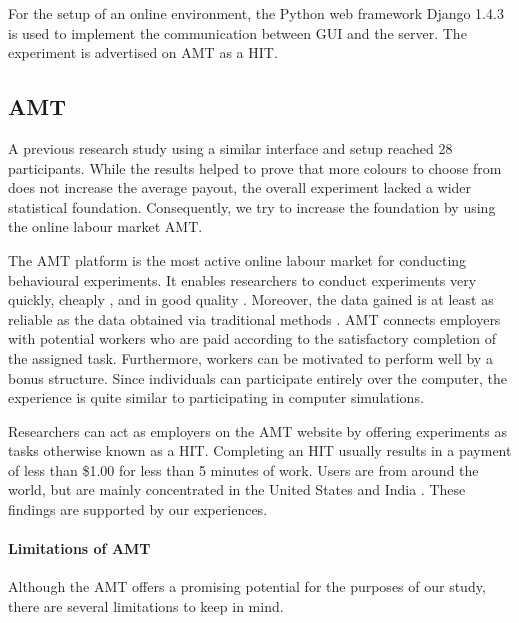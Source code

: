 For the setup of an online environment, the Python web framework Django 1.4.3 is used to implement the communication between \ac{GUI} and the server.
The experiment is advertised on \acf{AMT} as a \ac{HIT}.

\subsection{\acl{AMT}}
\label{ch:Experiment:sec:OnlineImplementation:subsec:AMT}
A previous research study \citep{Schmidt2012} using a similar interface and setup reached 28 participants. While the results helped to prove that more colours to choose from does not increase the average payout, the overall experiment lacked a wider statistical foundation.
Consequently, we try to increase the foundation by using the online labour market \acf{AMT}.

The \ac{AMT} platform is the most active online labour market for conducting behavioural experiments. It enables researchers to conduct experiments very quickly, cheaply \citep{Rand2012}, and in good quality \citep{Gardner2012}. Moreover, the data gained is at least as reliable as the data obtained via traditional methods \citep{Buhrmester2011}. \ac{AMT} connects employers with potential workers who are paid according to the satisfactory completion of the assigned task. Furthermore, workers can be motivated to perform well by a bonus structure. Since individuals can participate entirely over the computer, the experience is quite similar to participating in computer simulations.

Researchers can act as employers on the \ac{AMT} website by offering experiments as tasks otherwise known as a \acf{HIT}. Completing an \ac{HIT} usually results in a payment of less than \$1.00 for less than 5 minutes of work. Users are from around the world, but are mainly concentrated in the United States and India \citep{Rand2012}. These findings are supported by our experiences.

\paragraph{Limitations of \acl{AMT}}
Although the \ac{AMT} offers a promising potential for the purposes of our study, there are several limitations to keep in mind.

